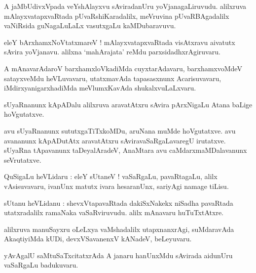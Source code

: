 \documentclass{article}
\begin{document}
\begin{mn}
A jaMbUdivxVpada veYshAlayxvu sAviradanUru yoVjanagaLiruvudu. 
alilxruva mAlayxvatapxvaRtada pUvaRshiKaradalilx, meVruvina pUvaRBAgadalilx 
vaNiRsida guNagaLuLaLx vasutxgaLu
kaMDubaravuvu.
\end{mn}

\begin{mn}
eleY bArxhamxNoVtatxmareV ! mAlayxvatapxvaRtada visAtxravu aivatutx sAvira yoVjanavu. 
alilxna `mahArajata' reMdu parxsidadhxrAgiruvaru.
\end{mn}

\begin{mn}
A mAnavarAdaroV barxhamxloVkadiMda cuyxtarAdavaru,
barxhamxvoMdeV satayxveMdu heVLuvavaru, utatxmavAda tapasasxnunx 
Acarisuvavaru, iMdirxyanigarxhadiMda meVlumxKavAda shukalxvuLaLxvaru.
\end{mn}

\begin{mn}
sUyaRnanunx kApADalu alilxruva aravatAtxru sAvira pArxNigaLu Atana baLige hoVgutatxve.
\end{mn}

\begin{mn}
avu sUyaRnanunx sututxgaTiTxkoMDu, aruNana muMde hoVgutatxve. 
avu avananunx kApADutAtx aravatAtxru sAviravaSaRgaLavaregU irutatxve. 
sUyaRna tApavanunx taDeyalAradeV, AnaMtara avu caMdarxmaMDalavanunx seVrutatxve.
\end{mn}


\begin{mn}
QuSigaLu heVLidaru : eleY sUtaneV ! vaSaRgaLu, pavaRtagaLu, alilx vAsisuvavaru, 
ivanUnx matutx ivara hesaranUnx, sariyAgi  namage tiLisu.
\end{mn}

\begin{mn}
sUtanu heVLidanu : shevxVtapavaRtada dakiSxNakekx niSadha pavaRtada utatxradalilx
ramaNaka vaSaRviruvudu. alilx mAnavaru huTuTxtAtxre.
\end{mn}

\begin{mn}
alilxruva manuSayxru oLeLxya vaMshadalilx utapxnanxrAgi, suMdaravAda AkaqtiyiMda kUDi, 
devxVSavanenxV kANadeV, beLeyuvaru.
\end{mn}

\begin{mn}
yAvAgalU saMtuSaTxcitatxrAda A janaru hanUnxMdu sAvirada aidunUru vaSaRgaLu badukuvaru.
\end{mn}
\end{document}
